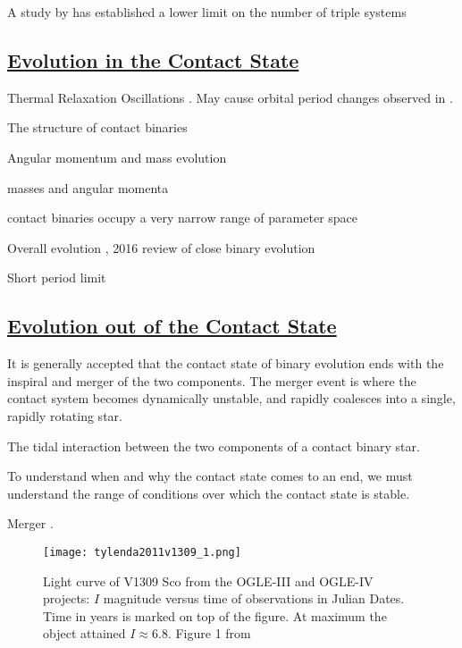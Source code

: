 \documentclass[12pt]{article} %
\numberwithin{equation}{section} %
\begin{document}
A study by \citet{pribulla2006contact} has established a lower limit on the number of triple systems

\subsection[Evolution in the Contact State]{\hyperlink{toc}{Evolution in the Contact State}}

Thermal Relaxation Oscillations \citep{wang1994thermal}. May cause orbital period changes observed in \citet{qian2001orbital}.

The structure of contact binaries \citep{kahler2004structure}

Angular momentum and mass evolution \citep{gazeas2008angular}

masses and angular momenta \citep{gazeas2006masses}

contact binaries occupy a very narrow range of parameter space \citep{gazeas2009physical}

Overall evolution \citep{stepien2008evolutionary}, 2016 review of close binary evolution \citep{tutukov2016evolution}

Short period limit \citep{rucinski2007short} \citep{drake2014ultra} \cite{lohr2012period}

\subsection[Evolution out of the Contact State]{\hyperlink{toc}{Evolution out of the Contact State}}

It is generally accepted that the contact state of binary evolution ends with the inspiral and merger of the two components. The merger event is where the contact system becomes dynamically unstable, and rapidly coalesces into a single, rapidly rotating star. 

The tidal interaction between the two components of a contact binary star.

To understand when and why the contact state comes to an end, we must understand the range of conditions over which the contact state is stable.

Merger \citet{tylenda2011v1309}.

\begin{figure}[H]
\centering
\texttt{[image: tylenda2011v1309\_1.png]}
\caption{Light curve of V1309 Sco from the OGLE-III and OGLE-IV projects: $I$ magnitude versus time of observations in Julian Dates. Time in years is marked on top of the figure. At maximum the object attained $I \approx 6.8$. Figure 1 from \citet{tylenda2011v1309}}
\label{fig: tylenda2011v1309_1}
\end{figure}
\end{document}
